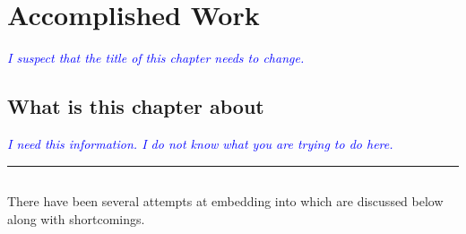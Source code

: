 \documentclass[thesis-solanki.tex]{subfiles}
\begin{document}
\chapter{Accomplished Work}\label{chap:proposedWork}

\textcolor{blue}{\textsl{I suspect that the title of this chapter needs to change.}}

\section{What is this chapter about}

\textcolor{blue}{\textsl{I need this information.
    I do not know what you are trying to do here.
}}

\noindent\rule{\textwidth}{0.5pt}


\section{}

There have been several attempts at embedding  into \yyy{}{\large,} which are
discussed below\yyy{}{\large,} along with  shortcomings.
\end{document}
